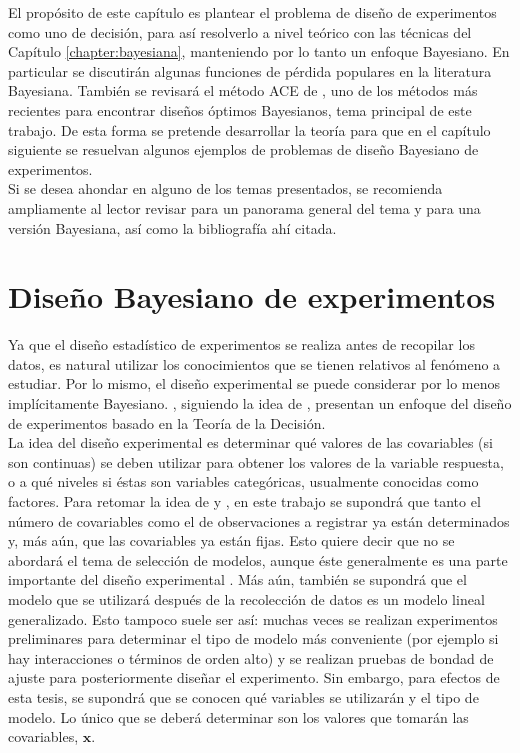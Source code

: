 El propósito de este capítulo es plantear el problema de diseño de experimentos como uno de decisión, para así resolverlo a nivel teórico con las técnicas del Capítulo \ref{chapter:bayesiana}, manteniendo por lo tanto un enfoque Bayesiano. En particular se discutirán algunas funciones de pérdida populares en la literatura Bayesiana. También se revisará el método ACE de \cite{Woods_ACE}, uno de los métodos más recientes para encontrar diseños óptimos Bayesianos, tema principal de este trabajo. De esta forma se pretende desarrollar la teoría para que en el capítulo siguiente se resuelvan algunos ejemplos de problemas de diseño Bayesiano de experimentos. \\


Si se desea ahondar en alguno de los temas presentados, se recomienda ampliamente al lector revisar \citep{box_hunter_hunter, montgomery_doe} para un panorama general del tema y \citep{chaloner_verdinelli_doe} para una versión Bayesiana, así como la bibliografía ahí citada.




\section{Diseño Bayesiano de experimentos}


Ya que el diseño estadístico de experimentos se realiza antes de recopilar los datos, es natural utilizar los conocimientos que se tienen relativos al fenómeno a estudiar. Por lo mismo, el diseño experimental se puede considerar por lo menos implícitamente Bayesiano. \cite{chaloner_verdinelli_doe}, siguiendo la idea de \citet[pp.~20-21]{lindley_review}, presentan un enfoque del diseño de experimentos basado en la Teoría de la Decisión. \\

La idea del diseño experimental es determinar qué valores de las covariables (si son continuas) se deben utilizar para obtener los valores de la variable respuesta, o a qué niveles si éstas son variables categóricas, usualmente conocidas como factores. Para retomar la idea de \cite{lindley_review} y \cite{chaloner_verdinelli_doe}, en este trabajo se supondrá que tanto el número de covariables como el de observaciones a registrar ya están determinados y, más aún, que las covariables ya están fijas. Esto quiere decir que no se abordará el tema de selección de modelos, aunque éste generalmente es una parte importante del diseño experimental \citep[ver][]{montgomery_doe}. Más aún, también se supondrá que el modelo que se utilizará después de la recolección de datos es un modelo lineal generalizado. Esto tampoco suele ser así: muchas veces se realizan experimentos preliminares para determinar el tipo de modelo más conveniente (por ejemplo si hay interacciones o términos de orden alto) y se realizan pruebas de bondad de ajuste para posteriormente diseñar el experimento. Sin embargo, para efectos de esta tesis, se supondrá que se conocen qué variables se utilizarán y el tipo de modelo. Lo único que se deberá determinar son los valores que tomarán las covariables, $\mathbf{x}$. \\


